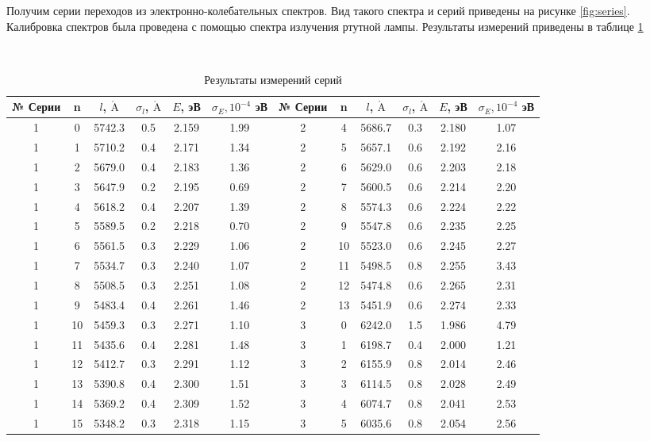 \documentclass[11.5pt,a4paper,russian]{article}
\def\AA{\mathring{\mathrm{A}}}
\begin{document}
Получим серии переходов из электронно-колебательных спектров. Вид такого спектра и серий приведены на рисунке \ref{fig:series}. Калибровка спектров была проведена с помощью спектра излучения ртутной лампы. Результаты измерений приведены в таблице \ref{table:data}

\begin{table}[b]
\centering
\caption{Результаты измерений серий}\
\label{table:data}
\begin{tabular}{c|c|c|c|c|c||c|c|c|c|c|c}
\toprule
№ Серии & n & $l$, $\AA$ & $\sigma_l$, $\AA$ & $E$, эВ & $\sigma_E, 10^{-4}$  эВ & № Серии & n & $l$, $\AA$ & $\sigma_l$, $\AA$ & $E$, эВ & $\sigma_E, 10^{-4}$  эВ \\
\midrule
1 & 0 & 5742.3 & 0.5 & 2.159 & 1.99 & 2 & 4 & 5686.7 & 0.3 & 2.180 & 1.07 \\
1 & 1 & 5710.2 & 0.4 & 2.171 & 1.34 & 2 & 5 & 5657.1 & 0.6 & 2.192 & 2.16 \\
1 & 2 & 5679.0 & 0.4 & 2.183 & 1.36 & 2 & 6 & 5629.0 & 0.6 & 2.203 & 2.18 \\
1 & 3 & 5647.9 & 0.2 & 2.195 & 0.69 & 2 & 7 & 5600.5 & 0.6 & 2.214 & 2.20 \\
1 & 4 & 5618.2 & 0.4 & 2.207 & 1.39 & 2 & 8 & 5574.3 & 0.6 & 2.224 & 2.22 \\
1 & 5 & 5589.5 & 0.2 & 2.218 & 0.70 & 2 & 9 & 5547.8 & 0.6 & 2.235 & 2.25 \\
1 & 6 & 5561.5 & 0.3 & 2.229 & 1.06 & 2 & 10 & 5523.0 & 0.6 & 2.245 & 2.27 \\
1 & 7 & 5534.7 & 0.3 & 2.240 & 1.07 & 2 & 11 & 5498.5 & 0.8 & 2.255 & 3.43 \\
1 & 8 & 5508.5 & 0.3 & 2.251 & 1.08 & 2 & 12 & 5474.8 & 0.6 & 2.265 & 2.31 \\
1 & 9 & 5483.4 & 0.4 & 2.261 & 1.46 & 2 & 13 & 5451.9 & 0.6 & 2.274 & 2.33 \\
1 & 10 & 5459.3 & 0.3 & 2.271 & 1.10 & 3 & 0 & 6242.0 & 1.5 & 1.986 & 4.79 \\
1 & 11 & 5435.6 & 0.4 & 2.281 & 1.48 & 3 & 1 & 6198.7 & 0.4 & 2.000 & 1.21 \\
1 & 12 & 5412.7 & 0.3 & 2.291 & 1.12 & 3 & 2 & 6155.9 & 0.8 & 2.014 & 2.46 \\
1 & 13 & 5390.8 & 0.4 & 2.300 & 1.51 & 3 & 3 & 6114.5 & 0.8 & 2.028 & 2.49 \\
1 & 14 & 5369.2 & 0.4 & 2.309 & 1.52 & 3 & 4 & 6074.7 & 0.8 & 2.041 & 2.53 \\
1 & 15 & 5348.2 & 0.3 & 2.318 & 1.15 & 3 & 5 & 6035.6 & 0.8 & 2.054 & 2.56 \\

\end{tabular}
\end{table}
\end{document}
